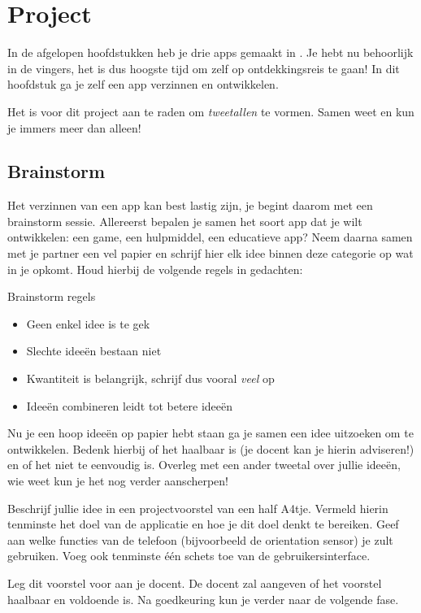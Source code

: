 \chapter{Project}

In de afgelopen hoofdstukken heb je drie apps gemaakt in \ai. Je hebt \ai nu behoorlijk in de vingers, het is dus hoogste tijd om zelf op ontdekkingsreis te gaan! In dit hoofdstuk ga je zelf een app verzinnen en ontwikkelen. 

Het is voor dit project aan te raden om \emph{tweetallen} te vormen. Samen weet en kun je immers meer dan alleen!

\section{Brainstorm}
Het verzinnen van een app kan best lastig zijn, je begint daarom met een brainstorm sessie. Allereerst bepalen je samen het soort app dat je wilt ontwikkelen: een game, een hulpmiddel, een educatieve app? Neem daarna samen met je partner een vel papier en schrijf hier elk idee binnen deze categorie op wat in je opkomt. Houd hierbij de volgende regels in gedachten:

\begin{derivation}{Brainstorm regels}
	\begin{itemize}
		\item Geen enkel idee is te gek
		\item Slechte idee\"en bestaan niet
		\item Kwantiteit is belangrijk, schrijf dus vooral \emph{veel} op
		\item Idee\"en combineren leidt tot betere idee\"en
	\end{itemize}
\end{derivation}

Nu je een hoop idee\"en op papier hebt staan ga je samen een idee uitzoeken om te ontwikkelen. Bedenk hierbij of het haalbaar is (je docent kan je hierin adviseren!) en of het niet te eenvoudig is. Overleg met een ander tweetal over jullie idee\"en, wie weet kun je het nog verder aanscherpen! 

\begin{opgave}
	\opgVraag
	Beschrijf jullie idee in een projectvoorstel van een half A4tje. Vermeld hierin tenminste het doel van de applicatie en hoe je dit doel denkt te bereiken. Geef aan welke functies van de telefoon (bijvoorbeeld de orientation sensor) je zult gebruiken. Voeg ook tenminste \'e\'en schets toe van de gebruikersinterface.
	
	Leg dit voorstel voor aan je docent. De docent zal aangeven of het voorstel haalbaar en voldoende is. Na goedkeuring kun je verder naar de volgende fase.
\end{opgave} 


